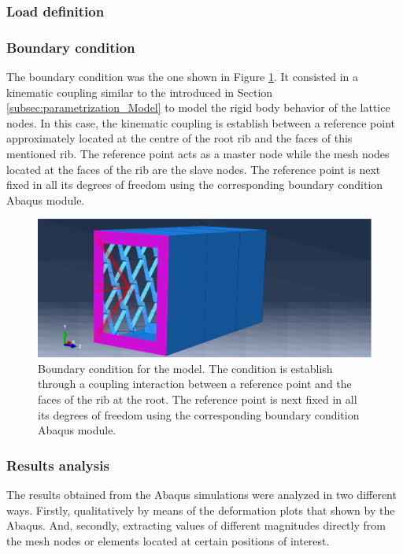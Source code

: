 \subsubsection{Load definition}

\subsubsection{Boundary condition}

  The boundary condition was the one shown in Figure \ref{fig:fixed}. It consisted in a kinematic coupling similar to the introduced in Section \ref{subsec:parametrization_Model} to model the rigid body behavior of the lattice nodes. In this case, the kinematic coupling is establish between a reference point approximately located at the centre of the root rib and the faces of this mentioned rib. The reference point acts as a master node while the mesh nodes located at the faces of the rib are the slave nodes. The reference point is next fixed in all its degrees of freedom using the corresponding boundary condition Abaqus module.

  \begin{figure}[!htpb]
    \centering
    \includegraphics[width=0.8 \textwidth]{../figures/result-model/fixed}
    \caption[Boundary condition for the model]{Boundary condition for the model. The condition is establish through a coupling interaction between a reference point and the faces of the rib at the root. The reference point is next fixed in all its degrees of freedom using the corresponding boundary condition Abaqus module.}\label{fig:fixed}
  \end{figure}

\subsubsection{Results analysis} %

  The results obtained from the Abaqus simulations were analyzed in two different ways. Firstly, qualitatively by means of the deformation plots that shown by the Abaqus. And, secondly, extracting values of different magnitudes directly from the mesh nodes or elements located at certain positions of interest.

